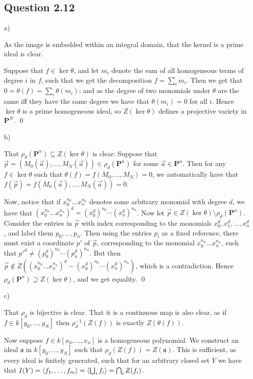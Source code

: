 \documentclass{article}
\begin{document}
\subsection*{Question 2.12}

\noindent a)

As the image is embedded within an integral domain, that the kernel is a prime ideal is clear.

Suppose that $f \in \ker \theta$, and let $m_i$ denote the sum of all homogeneous terms of degree $i$ in $f$, such that we get the decomposition $f = \sum_i m_i$. Then we get that $0 = \theta(f) = \sum_i \theta(m_i)$; and as the degree of two monomials under $\theta$ are the same iff they have the same degree we have that $\theta(m_i) =0$ for all $i$. Hence $\ker \theta$ is a prime homogeneous ideal, so $Z(\ker \theta)$ defines a projective variety in $\mathbf{P}^N$. \qed

\noindent b)

That $\rho_d(\mathbf{P}^n) \subseteq Z(\ker \theta)$ is clear: Suppose that $\vec p = (M_0(\vec a),\dots, M_N(\vec a)) \in \rho_d(\mathbf{P}^n)$ for some $\vec a \in \mathbf{P}^n$. Then for any $f \in \ker \theta$ such that $\theta(f) = f(M_0,\dots, M_N) = 0$, we automatically have that $f(\vec p) = f(M_0(\vec a),\dots, M_N(\vec a)) = 0$.


Now, notice that if $x_0^{n_0}\dots x_n^{n_n}$ denotes some arbitrary monomial with degree $d$, we have that $(x_0^{n_0}\dots x_n^{n_n})^d = (x_0^d)^{n_0} \cdots (x_n^d)^{n_n}$. Now let $\vec p \in Z(\ker \theta) \setminus \rho_d(\mathbf{P}^n)$. Consider the entries in $\vec p$ with index corresponding to the monomials $x_0^d, x_1^d, \dots, x_n^d$, and label them $p_0,\dots,p_n$. Then using the entries $p_i$ as a fixed reference, there must exist a coordinate $p'$ of $\vec p$, corresponding to the monomial $x_0^{n_0}\dots x_n^{n_n}$, such that $p'^d \neq (p_0^d)^{n_0} \cdots (p_n^d)^{n_n}$. But then $\vec p \not \in Z((x_0^{n_0}\dots x_n^{n_n})^d - (x_0^d)^{n_0} \cdots (x_n^d)^{n_n})$, which is a contradiction. Hence $\rho_d(\mathbf{P}^n) \supseteq Z(\ker \theta)$, and we get equality. \qed

\newpage
\noindent c)

That $\rho_d$ is bijective is clear. That it is a continuous map is also clear, as if $f \in k[y_0,\dots,y_N]$ then $\rho_d^{-1}(Z(f))$ is exactly $Z(\theta(f))$.

Now suppose $f \in k[x_0,\dots,x_n]$ is a homogeneous polynomial. We construct an ideal $\mathfrak a$ in $k[y_0,\dots,y_N]$ such that $\rho_d(Z(f)) = Z(\mathfrak a)$. This is sufficient, as every ideal is finitely generated, such that for an arbitrary closed set $Y$ we have that $I(Y) = \langle f_1,\dots, f_m\rangle = \langle\bigcup_i f_i\rangle = \bigcap_i Z(f_i)$.
\end{document}
